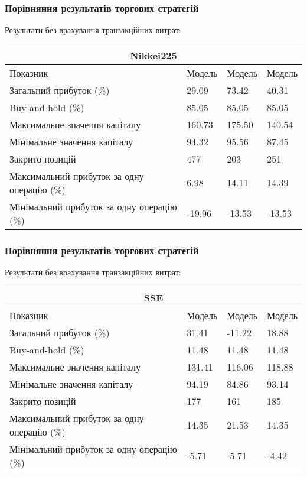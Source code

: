\documentclass[aspectratio=169]{beamer}
\begin{document}
	\begin{frame}
		\frametitle{Порівняння результатів торгових стратегій}
		Результати без врахування транзакційних витрат:\\
		\bigskip
		\begin{tabular}{ |p{7.8cm}||p{1.6cm}|p{1.6cm}|p{1.6cm}|  }
			\hline
			\multicolumn{4}{|c|}{Nikkei225} \\
			\hline
			Показник& Модель #1 &Модель #2&Модель #3\\
			\hline
			Загальний прибуток (\%)& \cellcolor{pink!25}29.09	&\cellcolor{pink!25}73.42&	\cellcolor{pink!25}40.31\\
			Buy-and-hold (\%) & \cellcolor{blue!8}85.05 &\cellcolor{blue!8}85.05& \cellcolor{blue!8}85.05\\
			Максимальне значення капіталу &	160.73&	175.50&	140.54\\
			Мінімальне значення капіталу&	94.32&	95.56	&87.45\\
			Закрито позицій&	477&	203	&251\\
			Максимальний прибуток за одну операцію (\%)&6.98	&14.11&	14.39	\\
			Мінімальний прибуток за одну операцію (\%)&	-19.96&	-13.53&	-13.53\\
			\hline
		\end{tabular}
	\end{frame}
	
	\begin{frame}
		\frametitle{Порівняння результатів торгових стратегій}
		Результати без врахування транзакційних витрат:\\
		\bigskip
		\begin{tabular}{ |p{7.8cm}||p{1.6cm}|p{1.6cm}|p{1.6cm}|  }
			\hline
			\multicolumn{4}{|c|}{SSE} \\
			\hline
			Показник& Модель #1 &Модель #2&Модель #3\\
			\hline
			Загальний прибуток (\%)&\cellcolor{green!25}31.41&	\cellcolor{pink!25}-11.22&	\cellcolor{green!25}18.88\\
			Buy-and-hold (\%) & \cellcolor{blue!8}11.48 &\cellcolor{blue!8}11.48 &\cellcolor{blue!8}11.48\\
			Максимальне значення капіталу &	131.41&	116.06&	118.88\\
			Мінімальне значення капіталу&	94.19&	84.86&	93.14\\
			Закрито позицій&177&	161	&185	\\
			Максимальний прибуток за одну операцію (\%)&	14.35&	21.53&	14.35\\
			Мінімальний прибуток за одну операцію (\%)& -5.71&	-5.71&	-4.42	\\
			\hline
		\end{tabular}
	\end{frame}
	
\end{document}
